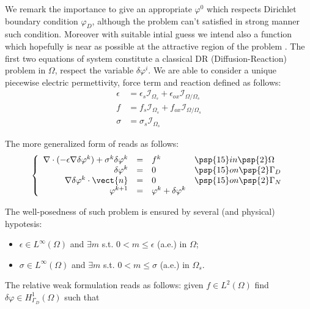 We remark the importance to give an appropriate $\varphi^0$ which respects Dirichlet boundary condition $\varphi_D$, although the problem can't satisfied in strong manner such condition. Moreover with suitable intial guess we intend also a function which hopefully is near as possible at the attractive region of the problem .
The first two equations of system  constitute a classical DR (Diffusion-Reaction) problem in $\Omega$, respect the variable $\delta \varphi^i$. We are able to consider a unique piecewise electric permettivity, force term and reaction defined as follows:
\begin{align*}
\epsilon & = \epsilon_s \mathcal{I}_{\Omega_s} + \epsilon_{ox} \mathcal{I}_{\Omega / \Omega_s} \\
f & = f_s \mathcal{I}_{\Omega_s} + f_{ox} \mathcal{I}_{\Omega / \Omega_s} \\
\sigma & = \sigma_s \mathcal{I}_{\Omega_s}
\end{align*}

The more generalized form of  reads as follows:
\begin{equation}
\label{sys: NLP general problem linearized}
\left\{
\begin{array}{rcll}
\nabla \cdot (-\epsilon \nabla \delta \varphi^k) + \sigma^k \delta \varphi^k & = &  f^k & \psp{15} in \psp{2} \Omega \\
\delta \varphi^k & = & 0 & \psp{15} on \psp{2} \Gamma_D \\
\nabla \delta \varphi ^k\cdot \vect{n} & = & 0 & \psp{15} on \psp{2} \Gamma_N
\\
\varphi^{k+1} & = & \varphi^k + \delta \varphi^k
\end{array}
\right.
\end{equation}

The well-posedness of such problem is ensured by several (and physical) hypotesis:
\begin{itemize}
\item $\epsilon \in L^{\infty}(\Omega)$ and $\exists m$ s.t. $0 < m \leq \epsilon$ (a.e.) in $\Omega$;
\item  $\sigma \in L^{\infty}(\Omega)$ and $\exists m$ s.t. $0 < m \leq \sigma$ (a.e.) in $\Omega_s$.
\end{itemize}

The relative weak formulation reads as follows: given $f \in L^2(\Omega)$ find $\delta\varphi \in H^1_{\Gamma_D}(\Omega)$ such that 

